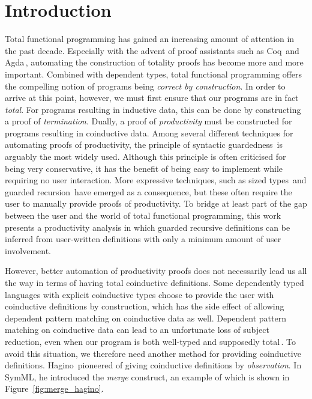 \chapter{Introduction}

Total functional programming has gained an increasing amount of attention in the
past decade. Especially with the advent of proof assistants such as
Coq\,\citep{Coq:manual} and Agda\,\citep{Norell:thesis}, automating
the construction of totality proofs has become more and more important. Combined
with dependent types, total functional programming offers the compelling notion
of programs being \emph{correct by construction}. In order to arrive at this
point, however, we must first ensure that our programs are in fact
\emph{total}. For programs resulting in inductive data, this can be done by constructing a proof of
\emph{termination}. Dually, a proof of \emph{productivity}
must be constructed for programs resulting in coinductive data. Among several
different techniques for automating proofs of productivity, the principle of
syntactic guardedness\,\citep{Coquand94} is arguably the most widely used. Although this principle
is often criticised for being very conservative, it has the benefit of being easy
to implement while requiring no user interaction. More expressive techniques,
such as sized types\,\citep{Abel99terminationchecking} and guarded
recursion\,\citep{Nakano:2000} have emerged as a consequence, but these often
require the user to manually provide proofs of productivity. To bridge at least
part of the gap between the user and the world of total functional programming,
this work presents a productivity analysis in which guarded recursive definitions
can be inferred from user-written definitions with only a minimum amount of user
involvement.

However, better automation of productivity proofs does not necessarily lead us
all the way in terms of having total coinductive definitions. Some dependently
typed languages with explicit coinductive types choose to provide the user with
coinductive definitions by construction, which has the side effect of allowing
dependent pattern matching on coinductive data as well. Dependent pattern
matching on coinductive data can lead to an
unfortunate loss of subject reduction, even when our program is both well-typed
and supposedly total\,\citep{Gimenez96uncalcul,OuryCounterexampleCoq,OuryCounterexampleAgda}. To avoid this situation, we therefore need another method
for providing coinductive definitions. Hagino\,\citep{Hagino89} pioneered of
giving coinductive definitions by \emph{observation}. In SymML, he introduced
the \emph{merge} construct, an example of which is shown in Figure~\ref{fig:merge_hagino}.

